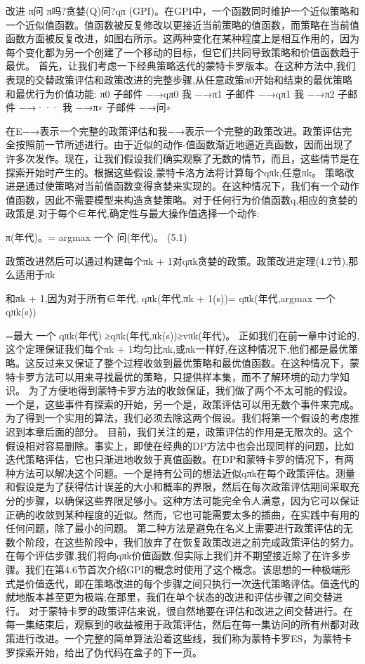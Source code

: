 改进
π问
π吗?贪婪(Q)问?qπ
(GPI)。在GPI中，一个函数同时维护一个近似策略和一个近似值函数。值函数被反复修改以更接近当前策略的值函数，而策略在当前值函数方面被反复改进，如图右所示。这两种变化在某种程度上是相互作用的，因为每个变化都为另一个创建了一个移动的目标，但它们共同导致策略和价值函数趋于最优。
首先，让我们考虑一下经典策略迭代的蒙特卡罗版本。在这种方法中,我们表现的交替政策评估和政策改进的完整步骤,从任意政策π0开始和结束的最优策略和最优行为价值功能:
π0
子邮件
−→qπ0
我
−→π1
子邮件
−→qπ1
我
−→π2
子邮件
−→···
我
−→π∗
子邮件
−→问∗

在E−→表示一个完整的政策评估和我−→表示一个完整的政策改进。政策评估完全按照前一节所述进行。由于近似的动作-值函数渐近地逼近真函数，因而出现了许多次发作。现在，让我们假设我们确实观察了无数的情节，而且，这些情节是在探索开始时产生的。根据这些假设,蒙特卡洛方法将计算每个qπk,任意πk。
策略改进是通过使策略对当前值函数变得贪婪来实现的。在这种情况下，我们有一个动作值函数，因此不需要模型来构造贪婪策略。对于任何行为价值函数q,相应的贪婪的政策是,对于每个∈年代,确定性与最大操作值选择一个动作:

π(年代)。= argmax
一个
问(年代)。 					(5.1)

政策改进然后可以通过构建每个πk + 1对qπk贪婪的政策。政策改进定理(4.2节),那么适用于πk

和πk + 1,因为对于所有∈年代,
qπk(年代,πk + 1(s))= qπk(年代,argmax
一个
qπk(s))

=最大
一个
qπk(年代)
≥qπk(年代,πk(s))≥vπk(年代)。
正如我们在前一章中讨论的,这个定理保证我们每个πk + 1均匀比πk,或πk一样好,在这种情况下,他们都是最优策略。这反过来又保证了整个过程收敛到最优策略和最优值函数。在这种情况下，蒙特卡罗方法可以用来寻找最优的策略，只提供样本集，而不了解环境的动力学知识。
为了方便地得到蒙特卡罗方法的收敛保证，我们做了两个不太可能的假设。一个是，这些事件有探索的开始，另一个是，政策评估可以用无数个事件来完成。为了得到一个实用的算法，我们必须去除这两个假设。我们将第一个假设的考虑推迟到本章后面的部分。
目前，我们关注的是，政策评估的作用是无限次的。这个假设相对容易删除。事实上，即使在经典的DP方法中也会出现同样的问题，比如迭代策略评估，它也只渐进地收敛于真值函数。在DP和蒙特卡罗的情况下，有两种方法可以解决这个问题。一个是持有公司的想法近似qπk在每个政策评估。测量和假设是为了获得估计误差的大小和概率的界限，然后在每次政策评估期间采取充分的步骤，以确保这些界限足够小。这种方法可能完全令人满意，因为它可以保证正确的收敛到某种程度的近似。然而，它也可能需要太多的插曲，在实践中有用的任何问题，除了最小的问题。
第二种方法是避免在名义上需要进行政策评估的无数个阶段，在这些阶段中，我们放弃了在恢复政策改进之前完成政策评估的努力。在每个评估步骤,我们将向qπk价值函数,但实际上我们并不期望接近除了在许多步骤。我们在第4.6节首次介绍GPI的概念时使用了这个概念。该思想的一种极端形式是价值迭代，即在策略改进的每个步骤之间只执行一次迭代策略评估。值迭代的就地版本甚至更为极端;在那里，我们在单个状态的改进和评估步骤之间交替进行。
对于蒙特卡罗的政策评估来说，很自然地要在评估和改进之间交替进行。在每一集结束后，观察到的收益被用于政策评估，然后在每一集访问的所有州都对政策进行改进。一个完整的简单算法沿着这些线，我们称为蒙特卡罗ES，为蒙特卡罗探索开始，给出了伪代码在盒子的下一页。

